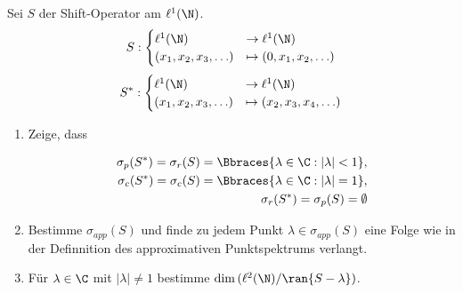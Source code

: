 \begin{exercise}[23/1]

Sei $S$ der Shift-Operator am $\ell^1(\N)$.
\begin{align*}
  S:
  \begin{cases}
    \ell^1(\N)              & \to     \ell^1(\N) \\
    (x_1, x_2, x_3, \ldots) & \mapsto (0, x_1, x_2, \ldots)
  \end{cases}
\end{align*}
\begin{align*}
  S^*:
  \begin{cases}
    \ell^1(\N)             & \to     \ell^1(\N) \\
    (x_1, x_2, x_3, \ldots) & \mapsto (x_2, x_3, x_4, \ldots)
  \end{cases}
\end{align*}
\begin{enumerate}[label = (\alph*)]

  \item
  Zeige, dass

  \begin{align*}
    \sigma_p(S^\ast) = \sigma_r(S) = \Bbraces{\lambda \in \C: |\lambda| < 1}, \\
    \sigma_c(S^\ast) = \sigma_c(S) = \Bbraces{\lambda \in \C: |\lambda| = 1}, \\
    \sigma_r(S^\ast) = \sigma_p(S) = \emptyset
  \end{align*}

  \item
  Bestimme $\sigma_{app}(S)$ und finde zu jedem Punkt $\lambda \in \sigma_{app}(S)$ eine Folge wie in der Definnition des approximativen Punktspektrums verlangt.

  \item
  Für $\lambda \in \C$ mit $|\lambda| \neq 1$ bestimme $\dim{(\ell^2(\N) / \ran{S - \lambda})}$.

\end{enumerate}

\end{exercise}

